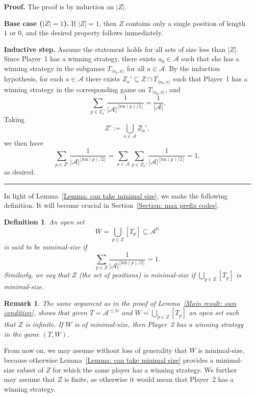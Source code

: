 \documentclass[a4,12pt]{article}%
\newtheorem{definition}[theorem]{Definition}
\newtheorem{remark}[theorem]{Remark}
\newenvironment{proof}[1][Proof]{\textbf{#1.} }{\ \rule{0.5em}{0.5em}}
\begin{document}
\begin{proof}
The proof is by induction on $|Z|$.  

\textbf{Base case ($|Z|=1$).}  
If $|Z|=1$, then $Z$ contains only a single position of length $1$ or $0$, and the desired property follows immediately.

\textbf{Inductive step.}  
Assume the statement holds for all sets of size less than $|Z|$.  
Since Player~1 has a winning strategy, there exists $a_0\in \mathcal A$ such that she has a winning strategy in the subgames $T_{\langle a_0,a\rangle}$ for all $a\in\mathcal A$.  
By the induction hypothesis, for each $a\in\mathcal A$ there exists $Z_a'\subseteq Z\cap T_{\langle a_0,a\rangle}$ such that Player~1 has a winning strategy in the corresponding game on $T_{\langle a_0,a \rangle }$, and
\[
\sum_{p\in Z_a'} \frac{1}{|\mathcal A|^{\lfloor \mathrm{len}(p)/2 \rfloor}} = \frac{1}{|\mathcal A|}.
\]  
Taking 
\[
Z' := \bigcup_{a\in\mathcal A} Z_a',
\]
we then have
\[
\sum_{p\in Z'} \frac{1}{|\mathcal A|^{\lfloor \mathrm{len}(p)/2 \rfloor}} = \sum_{a\in\mathcal A} \sum_{p\in Z_a'} \frac{1}{|\mathcal A|^{\lfloor \mathrm{len}(p)/2 \rfloor}} = 1,
\]
as desired.
\end{proof}

\medskip

In light of Lemma~\ref{Lemma: can take minimal size}, we make the following definition. It will become crucial in Section~\ref{Section: max prefix codes}.

\begin{definition} \label{definition: minimal size}
An open set 
\[
W = \bigcup_{p\in Z} [T_p] \subseteq \mathcal A^{\mathbb N}
\] 
is said to be \emph{minimal-size} if
\[
\sum_{p\in Z} \frac{1}{|\mathcal A|^{\lfloor \mathrm{len}(p)/2 \rfloor}} = 1.
\]  
Similarly, we say that $Z$ (the set of positions) is \emph{minimal-size} if $\bigcup_{p\in Z}[T_p]$ is minimal-size.
\end{definition}

\begin{remark}
The same argument as in the proof of Lemma~\ref{Main result: sum condition}, shows that given $T=\mathcal A^{\leq \mathbb N}$ and $W=\bigcup_{p\in Z}[T_p]$ an open set such that $Z$ is \emph{infinite}. If $W$ is of minimal-size, then Player~2 has a winning strategy in the game $(T,W)$.
\end{remark}

From now on, we may assume without loss of generality that $W$ is minimal-size, because otherwise Lemma~\ref{Lemma: can take minimal size} provides a minimal-size subset of $Z$ for which the same player has a winning strategy. We further may assume that $Z$ is finite, as otherwise it would mean that Player~2 has a winning strategy. 
\end{document}
